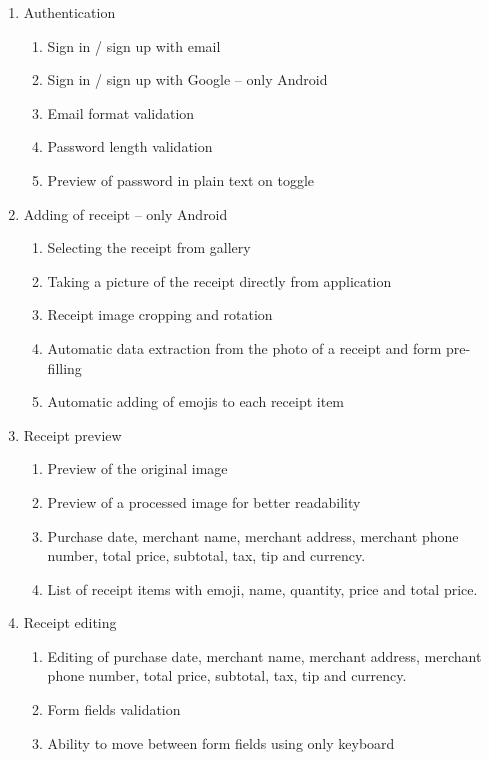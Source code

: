 \documentclass[
  digital, %
  table,   %
  oneside, %
  lof,     %
  lot,     %
]{fithesis3}
\begin{document}
\begin{enumerate}
    \item Authentication
        \begin{enumerate}
            \item Sign in / sign up with email
            \item Sign in / sign up with Google -- only Android
            \item Email format validation
            \item Password length validation
            \item Preview of password in plain text on toggle 
        \end{enumerate}
    \item Adding of receipt -- only Android
        \begin{enumerate}
            \item Selecting the receipt from gallery
            \item Taking a picture of the receipt directly from application
            \item Receipt image cropping and rotation
            \item Automatic data extraction from the photo of a receipt and form pre-filling
            \item Automatic adding of emojis to each receipt item
        \end{enumerate}
    \item Receipt preview
        \begin{enumerate}
            \item Preview of the original image
            \item Preview of a processed image for better readability
            \item Purchase date, merchant name, merchant address, merchant phone number, total price, subtotal, tax, tip and currency.
            \item List of receipt items with emoji, name, quantity, price and total price.
        \end{enumerate}
    \item Receipt editing
        \begin{enumerate}
            \item Editing of purchase date, merchant name, merchant address, merchant phone number, total price, subtotal, tax, tip and currency.
            \item Form fields validation
            \item Ability to move between form fields using only keyboard

\end{enumerate}
\end{enumerate}
\end{document}
